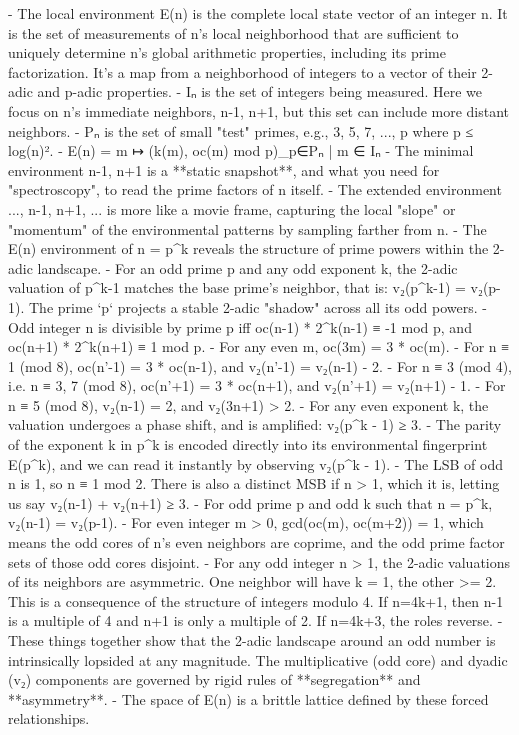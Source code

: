 \documentclass[12pt]{article}
\theoremstyle{plain}
\theoremstyle{definition}
\begin{document}
- The local environment E(n) is the complete local state vector of an integer n. It is the set of measurements of n's local neighborhood that are sufficient to uniquely determine n's global arithmetic properties, including its prime factorization. It's a map from a neighborhood of integers to a vector of their 2-adic and p-adic properties.
- Iₙ is the set of integers being measured. Here we focus on n's immediate neighbors, {n-1, n+1}, but this set can include more distant neighbors.
- Pₙ is the set of small "test" primes, e.g., {3, 5, 7, ..., p} where p ≤ log(n)².
- E(n) = {m ↦ (k(m), {oc(m) mod p})_p∈Pₙ | m ∈ Iₙ}
- The minimal environment {n-1, n+1} is a **static snapshot**, and what you need for "spectroscopy", to read the prime factors of n itself. 
- The extended environment {..., n-1, n+1, ...} is more like a movie frame, capturing the local "slope" or "momentum" of the environmental patterns by sampling farther from n.
- The E(n) environment of n = p^k reveals the structure of prime powers within the 2-adic landscape.
- For an odd prime p and any odd exponent k, the 2-adic valuation of p^k-1 matches the base prime's neighbor, that is: v₂(p^k-1) = v₂(p-1). The prime `p` projects a stable 2-adic "shadow" across all its odd powers.
- Odd integer n is divisible by prime p iff oc(n-1) * 2^k(n-1) ≡ -1 mod p, and oc(n+1) * 2^k(n+1) ≡ 1 mod p.
- For any even m, oc(3m) = 3 * oc(m).
- For n ≡ 1 (mod 8), oc(n'-1) = 3 * oc(n-1), and v₂(n'-1) = v₂(n-1) - 2.
- For n ≡ 3 (mod 4), i.e. n ≡ 3, 7 (mod 8), oc(n'+1) = 3 * oc(n+1), and v₂(n'+1) = v₂(n+1) - 1.
- For n ≡ 5 (mod 8), v₂(n-1) = 2, and v₂(3n+1) > 2.
- For any even exponent k, the valuation undergoes a phase shift, and is amplified: v₂(p^k - 1) ≥ 3. 
- The parity of the exponent k in p^k is encoded directly into its environmental fingerprint E(p^k), and we can read it instantly by observing v₂(p^k - 1).
- The LSB of odd n is 1, so n ≡ 1 mod 2. There is also a distinct MSB if n > 1, which it is, letting us say v₂(n-1) + v₂(n+1) ≥ 3.
- For odd prime p and odd k such that n = p^k, v₂(n-1) = v₂(p-1).
- For even integer m > 0, gcd(oc(m), oc(m+2)) = 1, which means the odd cores of n's even neighbors are coprime, and the odd prime factor sets of those odd cores disjoint.
- For any odd integer n > 1, the 2-adic valuations of its neighbors are asymmetric. One neighbor will have k = 1, the other >= 2. This is a consequence of the structure of integers modulo 4. If n=4k+1, then n-1 is a multiple of 4 and n+1 is only a multiple of 2. If n=4k+3, the roles reverse.
- These things together show that the 2-adic landscape around an odd number is intrinsically lopsided at any magnitude. The multiplicative (odd core) and dyadic (v₂) components are governed by rigid rules of **segregation** and **asymmetry**.
- The space of E(n) is a brittle lattice defined by these forced relationships. 
\end{document}
